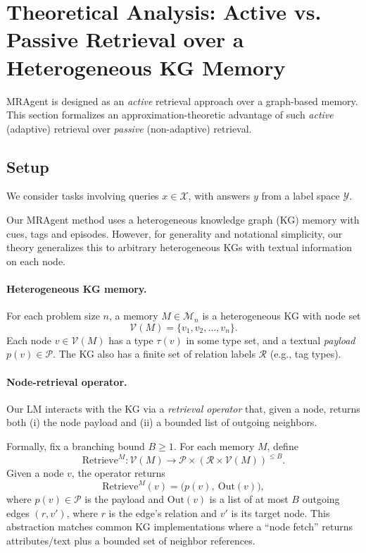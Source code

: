 \section{Theoretical Analysis: Active vs. Passive Retrieval over a Heterogeneous KG Memory}
\label{app:active-vs-passive-separation}

MRAgent is designed as an \emph{active} retrieval approach over a graph-based memory. This section formalizes an approximation-theoretic advantage of such
\emph{active} (adaptive) retrieval over \emph{passive} (non-adaptive) retrieval.


\subsection{Setup}

We consider tasks involving queries $x \in \mathcal{X}$, with answers $y$ from a label space \(\mathcal{Y}\).

Our MRAgent method uses a heterogeneous knowledge graph (KG) memory with cues, tags and episodes. However, for generality and notational simplicity, our theory generalizes this to arbitrary heterogeneous KGs with textual information on each node.

\paragraph{Heterogeneous KG memory.}
For each problem size \(n\), a memory \(M \in \mathcal{M}_n\) is a heterogeneous KG
with node set
\[
  \mathcal{V}(M) = \{v_1, v_2, \dots, v_n\}.
\]
Each node \(v \in \mathcal{V}(M)\) has a type \(\tau(v)\) in some type set, and a textual \emph{payload} $p(v) \in \mathcal{P}$.
The KG also has a finite set of relation labels
\(\mathcal{R}\) (e.g., tag types).

\paragraph{Node-retrieval operator.}
Our LM interacts with the KG via a \emph{retrieval operator} that, given a node, returns
both (i) the node payload and (ii) a bounded list of outgoing neighbors.

Formally, fix a branching bound \(B \ge 1\). For each memory \(M\), define
\[
  \mathrm{Retrieve}^M : \mathcal{V}(M) \to \mathcal{P} \times (\mathcal{R}\times \mathcal{V}(M))^{\le B}.
\]
Given a node \(v\), the operator returns
\[
  \mathrm{Retrieve}^M(v) = \bigl(p(v),\ \mathrm{Out}(v)\bigr),
\]
where \(p(v)\in\mathcal{P}\) is the payload and \(\mathrm{Out}(v)\) is a list of at most \(B\) outgoing edges \((r,v')\), where $r$ is the edge's relation and $v'$ is its target node. This abstraction matches common
KG implementations where a ``node fetch'' returns attributes/text plus a bounded set of
neighbor references.


